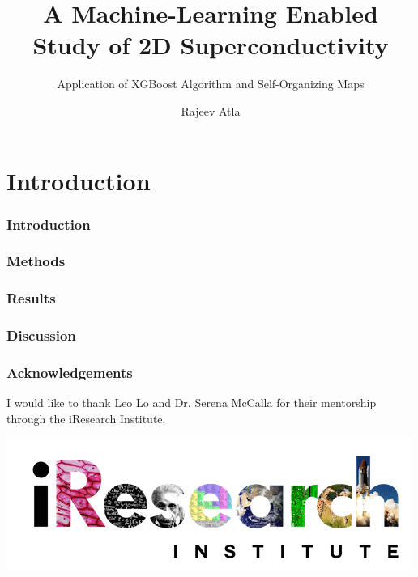 \documentclass[12pt]{beamer}
\title{A Machine-Learning Enabled Study of 2D Superconductivity}
\subtitle{Application of XGBoost Algorithm and Self-Organizing Maps}
\author[Rajeev Atla] %
{Rajeev Atla }
\institute[JPS] %
{
  John P. Stevens High School
}
\begin{document}
\frame{\titlepage}

\section{Introduction}

\begin{frame}
\frametitle{Introduction}


\end{frame}

\begin{frame}
\frametitle{Methods}

\end{frame}

\begin{frame}
\frametitle{Results}

\end{frame}


\begin{frame}
\frametitle{Discussion}

\end{frame}

\begin{frame}
\frametitle{Acknowledgements}
I would like to thank Leo Lo and Dr. Serena McCalla for their mentorship through the iResearch Institute.

\includegraphics[scale = 0.55]{iresearch.png}


\end{frame}
\end{document}

